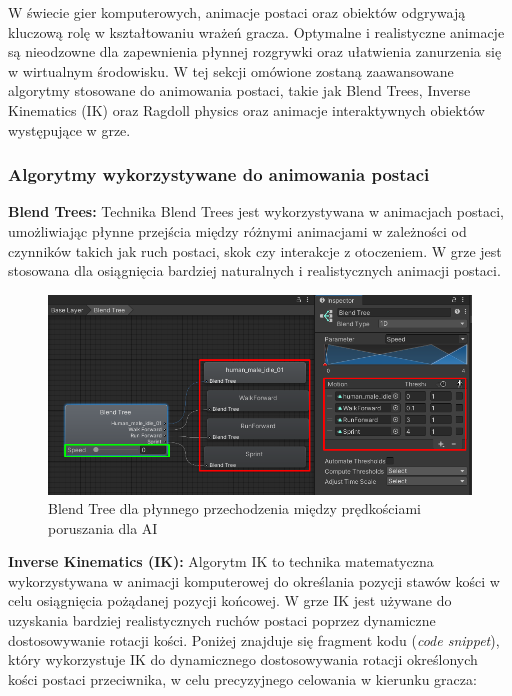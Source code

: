 W świecie gier komputerowych, animacje postaci oraz obiektów odgrywają kluczową rolę w kształtowaniu wrażeń gracza. Optymalne i realistyczne animacje są nieodzowne dla zapewnienia płynnej rozgrywki oraz ułatwienia zanurzenia się w wirtualnym środowisku. W tej sekcji omówione zostaną zaawansowane algorytmy stosowane do animowania postaci, takie jak Blend Trees, Inverse Kinematics (IK) oraz Ragdoll physics oraz animacje interaktywnych obiektów występujące w grze.


\subsubsection{Algorytmy wykorzystywane do animowania postaci}

\textbf{Blend Trees:} Technika Blend Trees jest wykorzystywana w animacjach postaci, umożliwiając płynne przejścia między różnymi animacjami w zależności od czynników takich jak ruch postaci, skok czy interakcje z otoczeniem. W grze jest stosowana dla osiągnięcia bardziej naturalnych i realistycznych animacji postaci.\\
\begin{figure}[h]
    \centering
    \includegraphics[width=1\linewidth]{Images/blendTree.png}
    \caption{Blend Tree dla płynnego przechodzenia między prędkościami poruszania dla AI}
\end{figure}
\FloatBarrier
\textbf{Inverse Kinematics (IK):}  Algorytm IK to technika matematyczna wykorzystywana w animacji komputerowej do określania pozycji stawów kości w celu osiągnięcia pożądanej pozycji końcowej. W grze IK jest używane do uzyskania bardziej realistycznych ruchów postaci poprzez dynamiczne dostosowywanie rotacji kości. Poniżej znajduje się fragment kodu (\textit{code snippet}), który wykorzystuje IK do dynamicznego dostosowywania rotacji określonych kości postaci przeciwnika, w celu precyzyjnego celowania w kierunku gracza:
